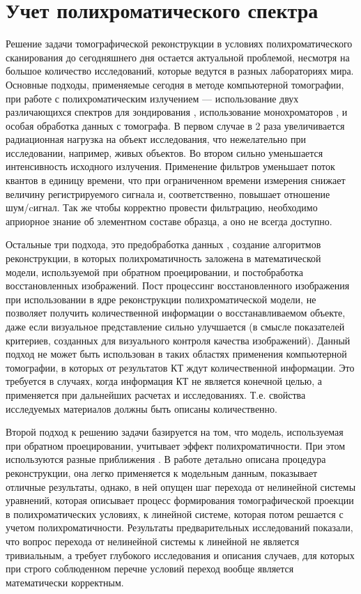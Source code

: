 \section{Учет полихроматического спектра}
Решение задачи томографической реконструкции в условиях полихроматического сканирования \cite{Herman1979bh} до сегодняшнего дня остается актуальной проблемой, несмотря на большое количество исследований, которые ведутся в разных лабораториях мира.
Основные подходы, применяемые сегодня в методе компьютерной томографии, при работе с полихроматическим излучением --- использование двух различающихся спектров для зондирования \cite{graser2009dual}, использование монохроматоров \cite{tan2012beam}, и особая обработка данных с томографа. 
В первом случае в 2 раза увеличивается радиационная нагрузка на объект исследования, что нежелательно при исследовании, например, живых объектов.
Во втором сильно уменьшается интенсивность исходного излучения.
Применение фильтров уменьшает поток квантов в единицу времени, что при ограниченном времени измерения снижает величину регистрируемого сигнала и, соответственно, повышает отношение шум/cигнал. 
Так же чтобы корректно провести фильтрацию, необходимо априорное знание об элементном составе образца, а оно не всегда доступно.

Остальные три подхода, это предобработка данных \cite{dewulf2012sense}, создание алгоритмов реконструкции, в которых полихроматичность заложена в математической модели, используемой при обратном проецировании, и постобработка восстановленных изображений. 
Пост процессинг восстановленного изображения \cite{krumm2008reducing} при использовании в ядре реконструкции полихроматической модели, не позволяет получить количественной информации о восстанавливаемом объекте, даже если визуальное представление сильно улучшается (в смысле показателей критериев, созданных для визуального контроля качества изображений).
Данный подход не может быть использован в таких областях применения компьютерной томографии, в которых от результатов КТ ждут количественной информации.
Это требуется в случаях, когда информация КТ не является конечной целью, а применяется при дальнейших расчетах и исследованиях.
Т.е. свойства исследуемых материалов должны быть описаны количественно.

Второй подход к решению задачи базируется на том, что модель, используемая при обратном проецировании, учитывает эффект полихроматичности.
При этом используются разные приближения \cite{stenner2010dynamic, van2011iterative}.
В работе \cite{brabant2012novel} детально описана процедура реконструкции, она легко применяется к модельным данным, показывает отличные результаты, однако, в ней опущен шаг перехода от нелинейной системы уравнений, которая описывает процесс формирования томографической проекции в полихроматических условиях, к линейной системе, которая потом решается с учетом полихроматичности.
Результаты предварительных исследований показали, что вопрос перехода от нелинейной системы к линейной не является тривиальным, а требует глубокого исследования и описания случаев, для которых при строго соблюденном перечне условий переход вообще является математически корректным.

